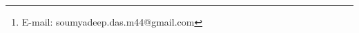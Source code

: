 \author[Soumyadeep Das et al.]{Soumyadeep Das$^{1}$\thanks{E-mail: soumyadeep.das.m44@gmail.com},
Daniel J. B. Smith$^{1}$, Marina I. Arnaudova$^{1}$
 \vspace{0.4cm}\\\\ 
 $^{1}$Centre for Astrophysics Research, University of Hertfordshire, Hatfield, AL10 9AB, UK \\ 
}
